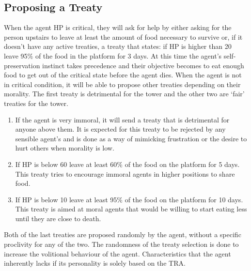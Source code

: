 \subsection{Proposing a Treaty}
When the agent HP is critical, they will ask for help by either asking for the person upstairs to leave at least the amount of food necessary to survive or, if it doesn’t have any active treaties, a treaty that states: if HP is higher than 20 leave 95\% of the food in the platform for 3 days. At this time the agent's self-preservation instinct takes precedence and their objective becomes to eat enough food to get out of the critical state before the agent dies.
When the agent is not in critical condition, it will be able to propose other treaties depending on their morality. The first treaty is detrimental for the tower and the other two are ‘fair’ treaties for the tower. \par
\begin{enumerate}
    \item If the agent is very immoral, it will send a treaty that is detrimental for anyone above them. It is expected for this treaty to be rejected by any sensible agent’s and is done as a way of mimicking frustration or the desire to hurt others when morality is low.
    \item If HP is below 60 leave at least 60\% of the food on the platform for 5 days. This treaty tries to encourage immoral agents in higher positions to share food. 
    \item If HP is below 10 leave at least 95\% of the food on the platform for 10 days. This treaty is aimed at moral agents that would be willing to start eating less until they are close to death.
\end{enumerate}
Both of the last treaties are proposed randomly by the agent, without a specific proclivity for any of the two. The randomness of the treaty selection is done to increase the volitional behaviour of the agent. Characteristics that the agent inherently lacks if its personality is solely based on the TRA.

